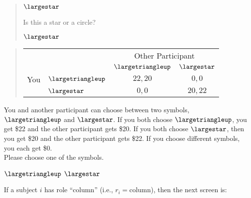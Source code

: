 \documentclass[11pt]{article}
\begin{document}
\begin{tcolorbox}
\begin{quote}
\begin{center}
{\Huge $\largestar$}
\end{center}
 \centering Is this a star or a circle?

 \begin{center}
$\largestar$ \qquad \textbigcircle
\end{center}
\end{quote}


\begin{quote}
\begin{center}
\begin{tabular}{llcc}
    & & \multicolumn{2}{c}{Other Participant}  \\
& & $\largetriangleup$ & $\largestar$  \\ \cline{3-4}
You & $\largetriangleup$ & \multicolumn{1}{|c|}{$22,20$} & \multicolumn{1}{c|}{$0,0$}  \\ \cline{3-4}
& $\largestar$ & \multicolumn{1}{|c|}{$0,0$} & \multicolumn{1}{c|}{$20,22$}  \\ \cline{3-4}
\end{tabular}
\end{center}
\end{quote}


You and another participant can choose between two symbols, $\largetriangleup$ and $\largestar$. If you both choose $\largetriangleup$, you get \$22 and the other participant gets \$20. If you both choose $\largestar$, then you get \$20 and the other participant gets \$22. If you choose different symbols, you each get \$0.\\

Please choose one of the symbols.\\

\begin{center}
$\largetriangleup$ \qquad $\largestar$
\end{center}
\end{tcolorbox}

If a subject $i$ has role ``column'' (i.e., $r_i=\text{column}$), then the next screen is:
\end{document}
